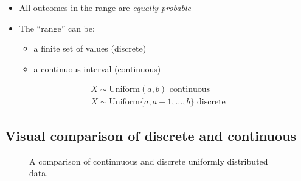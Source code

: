 \documentclass[
  a4paper,
]{scrbook}
\providecommand{\tightlist}{%
  \setlength{\itemsep}{0pt}\setlength{\parskip}{0pt}}\usepackage{longtable,booktabs,array}
\begin{document}
\begin{itemize}
\tightlist
\item
  All outcomes in the range are \emph{equally probable}
\item
  The ``range'' can be:

  \begin{itemize}
  \tightlist
  \item
    a finite set of values (discrete)
  \item
    a continuous interval (continuous)
  \end{itemize}
\end{itemize}

\begin{align}
X \sim \mathrm{Uniform}(a,b) \text{ continuous}\\
X \sim \mathrm{Uniform}\{a,a+1,\ldots,b\} \text{ discrete}
\end{align}

\subsection{Visual comparison of discrete and
continuous}\label{visual-comparison-of-discrete-and-continuous}

\begin{figure}[ht]


\caption{\label{fig-unif-pmf-pdf}A comparison of continnuous and
discrete uniformly distributed data.}

\end{figure}%
\end{document}
